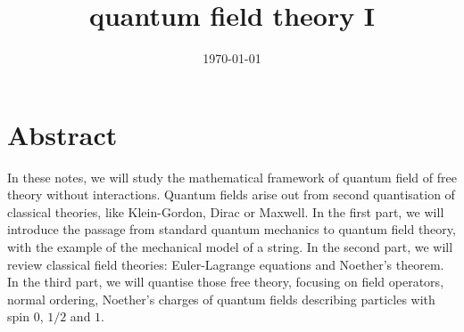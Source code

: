 \documentclass[a4paper, 12pt]{memoir}
\title{quantum field theory I}
\date{\today}
\begin{document}
\frontmatter



\tableofcontents

\mainmatter



\chapter*{Abstract}

    In these notes, we will study the mathematical framework of quantum field of free theory without interactions. Quantum fields arise out from second quantisation of classical theories, like Klein-Gordon, Dirac or Maxwell. In the first part, we will introduce the passage from standard quantum mechanics to quantum field theory, with the example of the mechanical model of a string. In the second part, we will review classical field theories: Euler-Lagrange equations and Noether's theorem. In the third part, we will quantise those free theory, focusing on field operators, normal ordering, Noether's charges of quantum fields describing particles with spin $0$, $1/2$ and $1$.
    






\backmatter

\nocite{qft1lecture}

\clearpage
{}
\printbibliography
\end{document}
